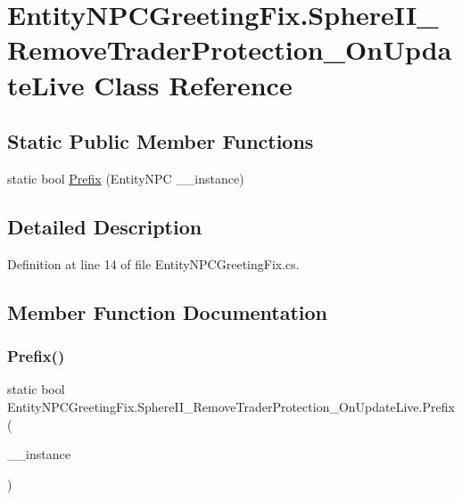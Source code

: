 \hypertarget{class_entity_n_p_c_greeting_fix_1_1_sphere_i_i___remove_trader_protection___on_update_live}{}\section{Entity\+N\+P\+C\+Greeting\+Fix.\+Sphere\+I\+I\+\_\+\+Remove\+Trader\+Protection\+\_\+\+On\+Update\+Live Class Reference}
\label{class_entity_n_p_c_greeting_fix_1_1_sphere_i_i___remove_trader_protection___on_update_live}
\subsection*{Static Public Member Functions}
\begin{DoxyCompactItemize}
\item 
static bool \mbox{\hyperlink{class_entity_n_p_c_greeting_fix_1_1_sphere_i_i___remove_trader_protection___on_update_live_a0cf95833a3db73930681f1bb8d62e8b5}{Prefix}} (Entity\+N\+PC \+\_\+\+\_\+instance)
\end{DoxyCompactItemize}


\subsection{Detailed Description}


Definition at line 14 of file Entity\+N\+P\+C\+Greeting\+Fix.\+cs.



\subsection{Member Function Documentation}
\mbox{\label{class_entity_n_p_c_greeting_fix_1_1_sphere_i_i___remove_trader_protection___on_update_live_a0cf95833a3db73930681f1bb8d62e8b5}} 
\subsubsection{\texorpdfstring{Prefix()}{Prefix()}}
{\footnotesize\ttfamily static bool Entity\+N\+P\+C\+Greeting\+Fix.\+Sphere\+I\+I\+\_\+\+Remove\+Trader\+Protection\+\_\+\+On\+Update\+Live.\+Prefix (\begin{DoxyParamCaption}\item[{Entity\+N\+PC}]{\+\_\+\+\_\+instance }\end{DoxyParamCaption})\hspace{0.3cm}{\ttfamily [static]}}



